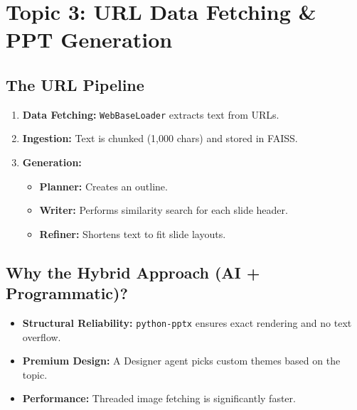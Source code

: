 \documentclass[12pt]{article}
\begin{document}
\section{Topic 3: URL Data Fetching \& PPT Generation}
\subsection*{The URL Pipeline}
\begin{enumerate}
    \item \textbf{Data Fetching:} \texttt{WebBaseLoader} extracts text from URLs.
    \item \textbf{Ingestion:} Text is chunked (1,000 chars) and stored in FAISS.
    \item \textbf{Generation:}
    \begin{itemize}
        \item \textbf{Planner:} Creates an outline.
        \item \textbf{Writer:} Performs similarity search for each slide header.
        \item \textbf{Refiner:} Shortens text to fit slide layouts.
    \end{itemize}
\end{enumerate}

\subsection*{Why the Hybrid Approach (AI + Programmatic)?}
\begin{itemize}
    \item \textbf{Structural Reliability:} \texttt{python-pptx} ensures exact rendering and no text overflow.
    \item \textbf{Premium Design:} A Designer agent picks custom themes based on the topic.
    \item \textbf{Performance:} Threaded image fetching is significantly faster.
\end{itemize}
\end{document}

